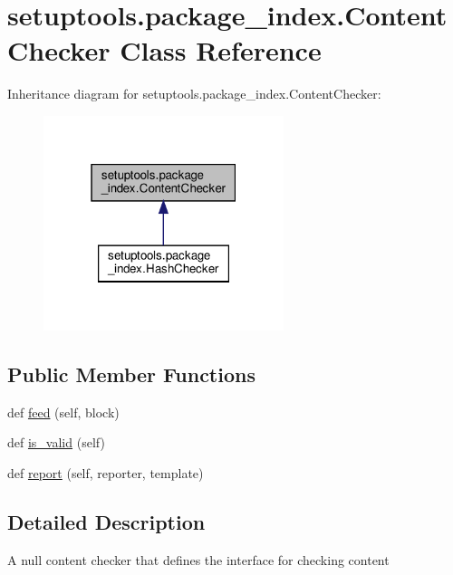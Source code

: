 \hypertarget{classsetuptools_1_1package__index_1_1ContentChecker}{}\section{setuptools.\+package\+\_\+index.\+Content\+Checker Class Reference}
\label{classsetuptools_1_1package__index_1_1ContentChecker}


Inheritance diagram for setuptools.\+package\+\_\+index.\+Content\+Checker\+:
\nopagebreak
\begin{figure}[H]
\begin{center}
\leavevmode
\includegraphics[width=199pt]{classsetuptools_1_1package__index_1_1ContentChecker__inherit__graph}
\end{center}
\end{figure}
\subsection*{Public Member Functions}
\begin{DoxyCompactItemize}
\item 
def \hyperlink{classsetuptools_1_1package__index_1_1ContentChecker_a13b8b787afa956344f5eab6445f1d214}{feed} (self, block)
\item 
def \hyperlink{classsetuptools_1_1package__index_1_1ContentChecker_a981f111f10e8174e1aa6fdc8f7999f26}{is\+\_\+valid} (self)
\item 
def \hyperlink{classsetuptools_1_1package__index_1_1ContentChecker_a861a390c4a6f66d304be4a23cbe51964}{report} (self, reporter, template)
\end{DoxyCompactItemize}


\subsection{Detailed Description}
\begin{DoxyVerb}A null content checker that defines the interface for checking content
\end{DoxyVerb}
 

